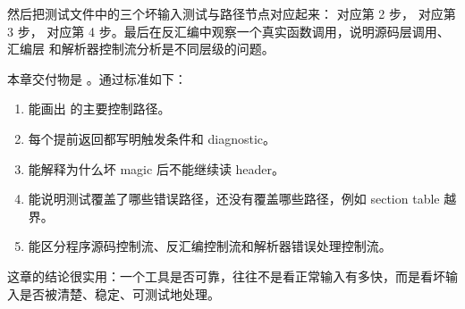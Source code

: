 然后把测试文件中的三个坏输入测试与路径节点对应起来： 对应第 2 步， 对应第 3 步， 对应第 4 步。最后在反汇编中观察一个真实函数调用，说明源码层调用、汇编层  和解析器控制流分析是不同层级的问题。


本章交付物是 。通过标准如下：

\begin{enumerate}
  \item 能画出  的主要控制路径。
  \item 每个提前返回都写明触发条件和 diagnostic。
  \item 能解释为什么坏 magic 后不能继续读 header。
  \item 能说明测试覆盖了哪些错误路径，还没有覆盖哪些路径，例如 section table 越界。
  \item 能区分程序源码控制流、反汇编控制流和解析器错误处理控制流。
\end{enumerate}

这章的结论很实用：一个工具是否可靠，往往不是看正常输入有多快，而是看坏输入是否被清楚、稳定、可测试地处理。
